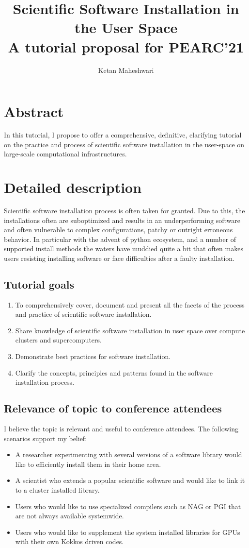 \documentclass{report}
\title{Scientific Software Installation in the User Space\\
       \large A tutorial proposal for PEARC'21
			 }
\author{Ketan Maheshwari}
\begin{document}
\maketitle
\section*{Abstract}
In this tutorial, I propose to offer a comprehensive, definitive, clarifying
tutorial on the practice and process of scientific software installation in the
user-space on large-scale computational infrastructures.

\section*{Detailed description}
Scientific software installation process is often taken for granted. Due to
this, the installations often are suboptimized and results in an
underperforming software and often vulnerable to complex configurations, patchy
or outright erroneous behavior.  In particular with the advent of python
ecosystem, and a number of supported install methods the waters have muddied
quite a bit that often makes users resisting installing software or face
difficulties after a faulty installation.

\subsection*{Tutorial goals}
\begin{enumerate}
\item To comprehensively cover, document and present all the facets of the process and practice of scientific software installation.
\item Share knowledge of scientific software installation in user space over compute clusters and supercomputers.
\item Demonstrate best practices for software installation.
\item Clarify the concepts, principles and patterns found in the software installation process.
\end{enumerate}

\subsection*{Relevance of topic to conference attendees}
I believe the topic is relevant and useful to conference attendees. The following scenarios support my belief:
\begin{itemize}
\item A researcher experimenting with several versions of a software library would like to efficiently install them in their home area.
\item A scientist who extends a popular scientific software and would like to link it to a cluster installed library.
\item Users who would like to use specialized compilers such as NAG or PGI that are not always available systemwide.
\item Users who would like to supplement the system installed libraries for GPUs with their own Kokkos driven codes.
\end{itemize}
\end{document}
